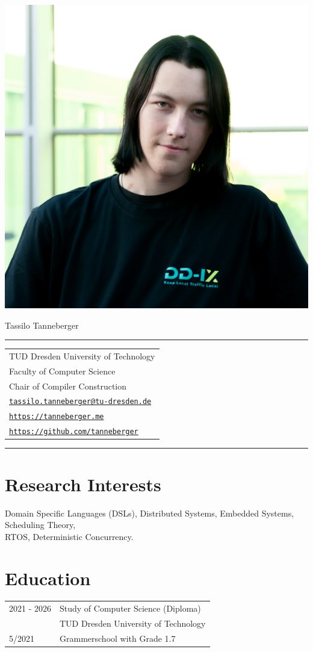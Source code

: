 \documentclass[11pt, a4paper, oneside]{article}
\begin{document}
\includegraphics[width=0.3\linewidth, right]{Tassilo} 
\vspace*{-16em}
\begin{flushleft}
\hspace*{1.3em} \huge Tassilo Tanneberger
\vspace*{-0.5em}
\par\noindent\rule{0.6\textwidth}{0.4pt}
\end{flushleft}

\vspace*{-0.4em}

\begin{tabular}{l}
TUD Dresden University of Technology  \\
Faculty of Computer Science \\ 
Chair of Compiler Construction \\ 
\href{mailto: tassilo.tanneberger@tu-dresden.de}{\texttt{tassilo.tanneberger@tu-dresden.de}} \\
\href{https://tanneberger.me}{\texttt{https://tanneberger.me}} \\
\href{https://github.com/tanneberger}{\texttt{https://github.com/tanneberger}}
\end{tabular}

\par\noindent\rule{0.6\textwidth}{0.4pt}

\section*{Research Interests}

Domain Specific Languages (DSLs), Distributed Systems, Embedded Systems, Scheduling Theory, \\ RTOS,  Deterministic Concurrency.  

\section*{Education}

\begin{tabular}{ R{3cm} L{10cm}}
	2021 - 2026 &  Study of Computer Science (Diploma) \\
							& TUD Dresden University of Technology \\ 
	5/2021			& Grammerschool with Grade 1.7
\end{tabular}
\end{document}
